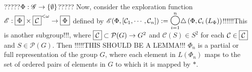 \documentclass[12pt,b5paper]{article}
\begin{document}
\color{red}?????\(\Phi:\mathscr{G} \to \left\{ \emptyset \right\}\)?????\color{black}
Now, consider the exploration function \(\mathscr{E}:\Phiset \times \Cset^{<\omega} \to \Phiset\) defined by \(\mathscr{E}(\Phi, \vect{\mathcal{C}_1,\cdots,\mathcal{C}_n}) := \underset{i=1}{\overset{n}\bbigcirc}\triangle\prnth{\Phi, \mathcal{C}_i\prnth{ L_{\Phi}}}\)\color{green}!!!!!!This is another subgroup!!!\color{black}, where \(\Cset\subset\mathcal{P}(G)\to G^2\) and 
\(\mathcal{C}(S)\in S^2\) for each \(\mathcal{C}\in\Cset\) and \(S\in\mathcal{P}(G)\). 
Then \color{red}!!!!!THIS SHOULD BE A LEMMA!!!\color{black} \(\Phi_n\) is a partial or full representation of the group \(G\), where each element in \( L (\Phi_n)\) maps to the set of ordered pairs of elements in \(G\) to which it is mapped by \(*\).

\newpage
\end{document}
